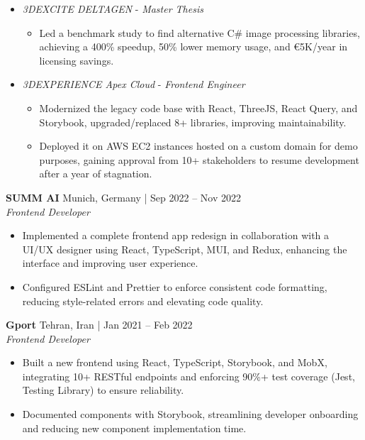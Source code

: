 \documentclass[a4paper,10pt]{article}
\begin{document}
\begin{itemize}[leftmargin=*]
\begin{itemize}[leftmargin=*]
        \end{itemize}
    \item \textit{3DEXCITE DELTAGEN} -  \textit{Master Thesis}
        \begin{itemize}[leftmargin=*]
            \item Led a benchmark study to find alternative C\# image processing libraries, achieving a 400\% speedup, 50\% lower memory usage, and €5K/year in licensing savings.
        \end{itemize}
    \item \textit{3DEXPERIENCE Apex Cloud} - \textit{Frontend Engineer}
        \begin{itemize}[leftmargin=*]
            \item Modernized the legacy code base with React, ThreeJS, React Query, and Storybook, upgraded/replaced 8+ libraries, improving maintainability.
            \item Deployed it on AWS EC2 instances hosted on a custom domain for demo purposes, gaining approval from 10+ stakeholders to resume development after a year of stagnation.
        \end{itemize}
\end{itemize}

\textbf{SUMM AI} \hfill Munich, Germany | Sep 2022 -- Nov 2022 \\
\textit{Frontend Developer} 
\begin{itemize}[leftmargin=*]
    \item Implemented a complete frontend app redesign in collaboration with a UI/UX designer using React, TypeScript, MUI, and Redux, enhancing the interface and improving user experience.
    \item Configured ESLint and Prettier to enforce consistent code formatting, reducing style-related errors and elevating code quality.
\end{itemize}

\textbf{Gport} \hfill Tehran, Iran | Jan 2021 -- Feb 2022  \\
\textit{Frontend Developer}
\begin{itemize}[leftmargin=*]
    \item Built a new frontend using React, TypeScript, Storybook, and MobX, integrating 10+ RESTful endpoints and enforcing 90\%+ test coverage (Jest, Testing Library) to ensure reliability.
    \item Documented components with Storybook, streamlining developer onboarding and reducing new component implementation time.
\end{itemize}
\vspace{-1em}
\end{document}
